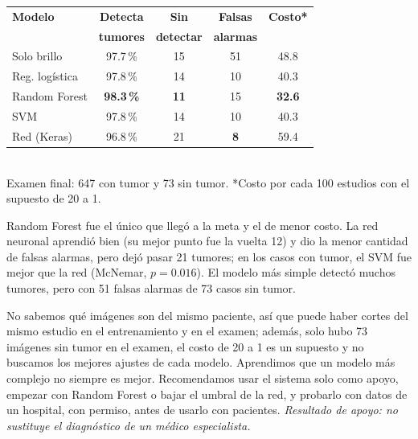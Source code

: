 \documentclass[10pt,letterpaper]{article}
\newcommand{\seccion}[1]{\par\vspace{3pt}{\small\bfseries #1}\par\vspace{0.5pt}}
\begin{document}
\newpage
\seccion{5. Resultados}
\begin{center}
\footnotesize
\setlength{\tabcolsep}{4pt}
\begin{tabular}{lcccc}
\hline
\textbf{Modelo} & \textbf{Detecta} & \textbf{Sin} & \textbf{Falsas} & \textbf{Costo*} \\
 & \textbf{tumores} & \textbf{detectar} & \textbf{alarmas} & \\
\hline
Solo brillo & 97.7\,\% & 15 & 51 & 48.8 \\
Reg. logística & 97.8\,\% & 14 & 10 & 40.3 \\
Random Forest & \textbf{98.3\,\%} & \textbf{11} & 15 & \textbf{32.6} \\
SVM & 97.8\,\% & 14 & 10 & 40.3 \\
Red (Keras) & 96.8\,\% & 21 & \textbf{8} & 59.4 \\
\hline
\end{tabular}\\[2pt]
{\footnotesize Examen final: 647 con tumor y 73 sin tumor. *Costo por cada 100 estudios con el supuesto de 20 a 1.}
\end{center}
Random Forest fue el único que llegó a la meta y el de menor costo. La red neuronal aprendió bien (su mejor punto fue la vuelta 12) y dio la menor cantidad de falsas alarmas, pero dejó pasar 21 tumores; en los casos con tumor, el SVM fue mejor que la red (McNemar, $p=0.016$). El modelo más simple detectó muchos tumores, pero con 51 falsas alarmas de 73 casos sin tumor.

\seccion{6. Retos, límites y conclusión}
No sabemos qué imágenes son del mismo paciente, así que puede haber cortes del mismo estudio en el entrenamiento y en el examen; además, solo hubo 73 imágenes sin tumor en el examen, el costo de 20 a 1 es un supuesto y no buscamos los mejores ajustes de cada modelo. Aprendimos que un modelo más complejo no siempre es mejor. Recomendamos usar el sistema solo como apoyo, empezar con Random Forest o bajar el umbral de la red, y probarlo con datos de un hospital, con permiso, antes de usarlo con pacientes. \emph{Resultado de apoyo: no sustituye el diagnóstico de un médico especialista.}
\end{document}

